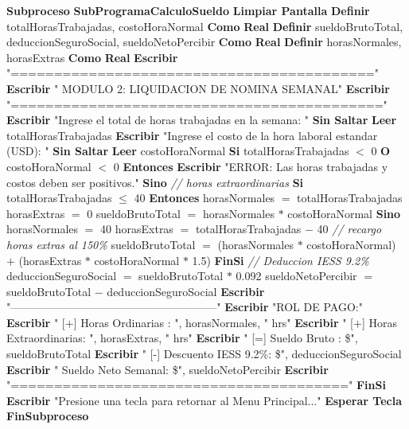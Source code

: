 \documentclass[12pt,a4paper]{article}
\newcommand{\kw}[1]{\textcolor{pseKeyword}{\textbf{#1}}}
\newcommand{\txt}[1]{\textcolor{pseString}{"#1"}}
\newcommand{\num}[1]{\textcolor{pseNumber}{#1}}
\newcommand{\cmt}[1]{\textcolor{pseComment}{\textit{// #1}}}
\newcommand{\opAsig}{\textcolor{pseKeyword}{$=$}}
\newcommand{\opMas}{\textcolor{pseKeyword}{$+$}}
\newcommand{\opMenos}{\textcolor{pseKeyword}{$-$}}
\newcommand{\opPor}{\textcolor{pseKeyword}{$*$}}
\newcommand{\opMenor}{\textcolor{pseKeyword}{$<$}}
\newcommand{\opMenorIgual}{\textcolor{pseKeyword}{$\leq$}}
\newcommand{\Asignacion}[2]{#1\; \opAsig\; #2}
\newcommand{\Escribir}[1]{\kw{Escribir} #1}
\newcommand{\EscribirSS}[1]{\kw{Escribir} #1 \kw{Sin Saltar}}
\newcommand{\Leer}[1]{\kw{Leer} #1}
\newcommand{\Definir}[2]{\kw{Definir} #1 \kw{Como} \kw{#2}}
\newcommand{\Si}[1]{\kw{Si} #1 \kw{Entonces}}
\newcommand{\Sino}{\kw{Sino}}
\newcommand{\FinSi}{\kw{FinSi}}
\newcommand{\Subproceso}[1]{\kw{Subproceso} \textbf{#1}}
\newcommand{\FinSubproceso}{\kw{FinSubproceso}}
\newcommand{\I}{\hspace{1.5em}}
\newcommand{\II}{\hspace{3.0em}}
\newcommand{\III}{\hspace{4.5em}}
\begin{document}
\begin{algorithmic}[1]
	\State \Subproceso{SubProgramaCalculoSueldo}
	\State \I \kw{Limpiar Pantalla}
	\State \I \Definir{totalHorasTrabajadas, costoHoraNormal}{Real}
	\State \I \Definir{sueldoBrutoTotal, deduccionSeguroSocial, sueldoNetoPercibir}{Real}
	\State \I \Definir{horasNormales, horasExtras}{Real}
	\State
	\State \I \Escribir{\txt{==========================================}}
	\State \I \Escribir{\txt{    MODULO 2: LIQUIDACION DE NOMINA SEMANAL}}
	\State \I \Escribir{\txt{===========================================}}
	\State \I \EscribirSS{\txt{Ingrese el total de horas trabajadas en la semana: }}
	\State \I \Leer{totalHorasTrabajadas}
	\State \I \EscribirSS{\txt{Ingrese el costo de la hora laboral estandar (USD): }}
	\State \I \Leer{costoHoraNormal}
	\State
	\State \I \Si{totalHorasTrabajadas \opMenor{} \num{0} \kw{ O } costoHoraNormal \opMenor{} \num{0}}
	\State \II \Escribir{\txt{ERROR: Las horas trabajadas y costos deben ser positivos.}}
	\State \I \Sino
	\State \II \cmt{horas extraordinarias}
	\State \II \Si{totalHorasTrabajadas \opMenorIgual{} \num{40}}
	\State \III \Asignacion{horasNormales}{totalHorasTrabajadas}
	\State \III \Asignacion{horasExtras}{\num{0}}
	\State \III \Asignacion{sueldoBrutoTotal}{horasNormales \opPor{} costoHoraNormal}
	\State \II \Sino
	\State \III \Asignacion{horasNormales}{\num{40}}
	\State \III \Asignacion{horasExtras}{totalHorasTrabajadas \opMenos{} \num{40}}
	\State \III \cmt{recargo horas extras al 150\%}
	\State \III \Asignacion{sueldoBrutoTotal}{(horasNormales \opPor{} costoHoraNormal) \opMas{} (horasExtras \opPor{} costoHoraNormal \opPor{} \num{1.5})}
	\State \II \FinSi
	\State
	\State \II \cmt{Deduccion IESS 9.2\%}
	\State \II \Asignacion{deduccionSeguroSocial}{sueldoBrutoTotal \opPor{} \num{0.092}}
	\State \II \Asignacion{sueldoNetoPercibir}{sueldoBrutoTotal \opMenos{} deduccionSeguroSocial}
	\State
	\State \II \Escribir{\txt{--------------------------------------------------------}}
	\State \II \Escribir{\txt{ROL DE PAGO:}}
	\State \II \Escribir{\txt{  [+] Horas Ordinarias   : }, horasNormales, \txt{ hrs}}
	\State \II \Escribir{\txt{  [+] Horas Extraordinarias: }, horasExtras, \txt{ hrs}}
	\State \II \Escribir{\txt{  [=] Sueldo Bruto        : \$}, sueldoBrutoTotal}
	\State \II \Escribir{\txt{  [-] Descuento IESS 9.2\%: \$}, deduccionSeguroSocial}
	\State \II \Escribir{\txt{   Sueldo Neto Semanal: \$}, sueldoNetoPercibir}
	\State \II \Escribir{\txt{=======================================}}
	\State \I \FinSi
	\State \I \Escribir{\txt{Presione una tecla para retornar al Menu Principal...}}
	\State \I \kw{Esperar Tecla}
	\State \FinSubproceso
	

\end{algorithmic}
\end{document}
